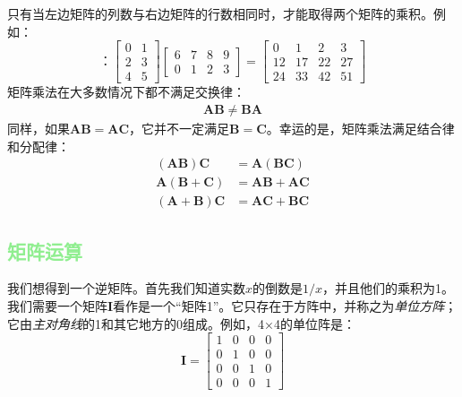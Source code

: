 \documentclass[lang=cn,12pt]{elegantbook}
\begin{document}
只有当左边矩阵的列数与右边矩阵的行数相同时，才能取得两个矩阵的乘积。例如：
$$：\left[\begin{array}{ll}
      0 & 1 \\
      2 & 3 \\
      4 & 5
    \end{array}\right]\left[\begin{array}{llll}
      6 & 7 & 8 & 9 \\
      0 & 1 & 2 & 3
    \end{array}\right]=\left[\begin{array}{rrrr}
      0  & 1  & 2  & 3  \\
      12 & 17 & 22 & 27 \\
      24 & 33 & 42 & 51
    \end{array}\right]
$$
矩阵乘法在大多数情况下都不满足交换律：
\begin{align}
  \mathbf{AB} \neq \mathbf{BA}
\end{align}
同样，如果$\mathbf{AB} = \mathbf{AC}$，它并不一定满足$\mathbf{B} = \mathbf{C}$。幸运的是，矩阵乘法满足结合律和分配律：
$$
  \begin{aligned}
    (\mathbf{A B}) \mathbf{C}          & =\mathbf{A}(\mathbf{B C})  \\
    \mathbf{A}(\mathbf{B}+\mathbf{C})  & =\mathbf{A B}+\mathbf{A C} \\
    (\mathbf{A}+\mathbf{B}) \mathbf{C} & =\mathbf{A C}+\mathbf{B C}
  \end{aligned}
$$

\subsection{\textcolor{lightgreen}{矩阵运算}}

我们想得到一个逆矩阵。首先我们知道实数$x$的倒数是$1/x$，并且他们的乘积为1。我们需要一个矩阵$\mathbf{I}$看作是一个“矩阵1”。它只存在于方阵中，并称之为\textit{单位方阵}；它由\textit{主对角线}的1和其它地方的0组成。例如，4×4的单位阵是：
$$
  \mathbf{I}=\left[\begin{array}{llll}
      1 & 0 & 0 & 0 \\
      0 & 1 & 0 & 0 \\
      0 & 0 & 1 & 0 \\
      0 & 0 & 0 & 1
    \end{array}\right]
$$
\end{document}

